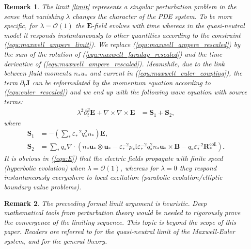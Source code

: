 \documentclass{article}
\newtheorem*{remark}{Remark}
\begin{document}
\begin{remark}
  \label{rem:limit}
  The limit \eqref{limit} represents a \emph{singular perturbation problem} in the sense
  that vanishing $\lambda$ changes the character of the PDE system. To be more specific,
  for $\lambda = \mathcal{O}(1)$ the $\mathbf{E}$-field evolves with time whereas in the
  quasi-neutral model it responds instantaneously to other quantities according to the
  constraint (\ref{equ:maxwell_ampere_limit}). We replace
  (\ref{equ:maxwell_ampere_rescaled}) by the sum of the rotation of
  (\ref{equ:maxwell_faraday_rescaled}) and the time-derivative of
  (\ref{equ:maxwell_ampere_rescaled}). Meanwhile, due to the link between fluid momenta
  $n_*u_*$ and current in (\ref{equ:maxwell_euler_coupling}), the term
  $\partial_t\mathbf{J}$ can be reformulated by the momentum equation according to
  (\ref{equ:euler_rescaled}) and we end up with the following wave equation with source
  terms:
  \begin{align}
    \lambda^2\partial_t^2 \mathbf{E} + \nabla \times \nabla \times \mathbf{E} &= \mathbf{S}_1 + \mathbf{S}_2, \label{equ:E}
  \end{align}
  where
  \begin{align}
    \mathbf{S}_1 &= - \left(\sum_*\varepsilon_*^{-2}q_*^2n_*\right)\mathbf{E}, \\
    \mathbf{S}_2 &= \sum_* q_*\nabla\cdot(n_* \mathbf{u}_* \otimes \mathbf{u}_*
    - \varepsilon_*^{-2}p_*\mathbb{I}\varepsilon_*^{-2}q_*^2n_*\mathbf{u}_*\times\mathbf{B}
    - q_*\varepsilon_*^{-2}\mathbf{R}^\text{coll}_*).
  \end{align}
  It is obvious in (\ref{equ:E}) that the electric fields propagate with finite speed
  (hyperbolic evolution) when $\lambda = \mathcal{O}(1)$, whereas for $\lambda = 0$ they
  respond instantaneously everywhere to local excitation (parabolic evolution/elliptic
  boundary value problems).
\end{remark}

\begin{remark}
  The preceeding formal limit argument is heuristic. Deep mathematical tools from
  perturbation theory would be needed to rigorously prove the convergence of the limiting
  sequence. This topic is beyond the scope of this paper. Readers are referred to
  \cite[Ch. 2]{remi_2014} \cite{Peng_2008} for the quasi-neutral limit of the
  Maxwell-Euler system, and \cite{mark_1995, Eckhaus_1980} for the general theory.
\end{remark} 
\end{document}
